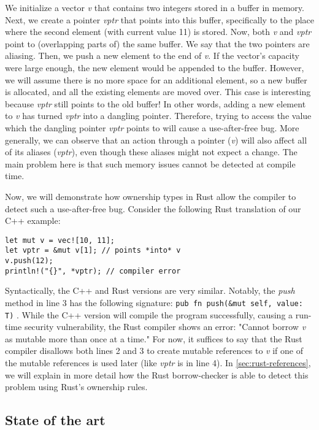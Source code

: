 \documentclass[sigplan,11pt,nonacm]{acmart}
\begin{document}
We initialize a vector \emph{v} that contains two integers stored in a buffer in memory.
Next, we create a pointer \emph{vptr} that points into this buffer, specifically to the place where the second element (with current value 11) is stored.
Now, both \emph{v} and \emph{vptr} point to (overlapping parts of) the same buffer.
We say that the two pointers are aliasing.
Then, we push a new element to the end of \emph{v}.
If the vector's capacity were large enough, the new element would be appended to the buffer.
However, we will assume there is no more space for an additional element, so a new buffer is allocated, and all the existing elements are moved over.
This case is interesting because \emph{vptr} still points to the old buffer!
In other words, adding a new element to \emph{v} has turned \emph{vptr} into a dangling pointer.
Therefore, trying to access the value which the dangling pointer \emph{vptr} points to will cause a use-after-free bug.
More generally, we can observe that an action through a pointer (\emph{v}) will also affect all of its aliases (\emph{vptr}), even though these aliases might not expect a change.
The main problem here is that such memory issues cannot be detected at compile time.

Now, we will demonstrate how ownership types in Rust allow the compiler to detect such a use-after-free bug.
Consider the following Rust translation of our C++ example:

\begin{lstlisting}
let mut v = vec![10, 11];
let vptr = &mut v[1]; // points *into* v
v.push(12);
println!("{}", *vptr); // compiler error
\end{lstlisting}

Syntactically, the C++ and Rust versions are very similar.
Notably, the \emph{push} method in line 3 has the following signature: \verb|pub fn push(&mut self, value: T)| \cite{rust-vector-documentation}.
While the C++ version will compile the program successfully, causing a run-time security vulnerability, the Rust compiler shows an error: "Cannot borrow \emph{v} as mutable more than once at a time."
For now, it suffices to say that the Rust compiler disallows both lines 2 and 3 to create mutable references to \emph{v} if one of the mutable references is used later (like \emph{vptr} is in line 4).
In \ref{sec:rust-references}, we will explain in more detail how the Rust borrow-checker is able to detect this problem using Rust's ownership rules.


\subsection{State of the art}
\label{sec:state-of-the-art}
\end{document}
